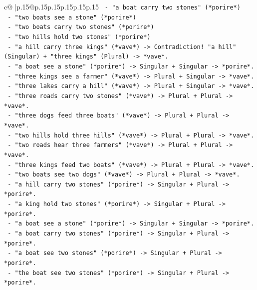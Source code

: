 \documentclass{article}
\begin{document}
{\begin{supertabular}{c@{$\;$}|p{.15\linewidth}@{}p{.15\linewidth}p{.15\linewidth}p{.15\linewidth}p{.15\linewidth}p{.15\linewidth}}
{{{\texttt{         {-} "a boat carry two stones" (*porire*)} \\
\texttt{         {-} "two boats see a stone" (*porire*)} \\
\texttt{         {-} "two boats carry two stones" (*porire*)} \\
\texttt{         {-} "two hills hold two stones" (*porire*)} \\
\texttt{         {-} "a hill carry three kings" (*vave*) {-}> Contradiction! "a hill" (Singular) + "three kings" (Plural) {-}> *vave*.} \\
\texttt{         {-} "a boat see a stone" (*porire*) {-}> Singular + Singular {-}> *porire*.} \\
\texttt{         {-} "three kings see a farmer" (*vave*) {-}> Plural + Singular {-}> *vave*.} \\
\texttt{         {-} "three lakes carry a hill" (*vave*) {-}> Plural + Singular {-}> *vave*.} \\
\texttt{         {-} "three roads carry two stones" (*vave*) {-}> Plural + Plural {-}> *vave*.} \\
\texttt{         {-} "three dogs feed three boats" (*vave*) {-}> Plural + Plural {-}> *vave*.} \\
\texttt{         {-} "two hills hold three hills" (*vave*) {-}> Plural + Plural {-}> *vave*.} \\
\texttt{         {-} "two roads hear three farmers" (*vave*) {-}> Plural + Plural {-}> *vave*.} \\
\texttt{         {-} "three kings feed two boats" (*vave*) {-}> Plural + Plural {-}> *vave*.} \\
\texttt{         {-} "two boats see two dogs" (*vave*) {-}> Plural + Plural {-}> *vave*.} \\
\texttt{         {-} "a hill carry two stones" (*porire*) {-}> Singular + Plural {-}> *porire*.} \\
\texttt{         {-} "a king hold two stones" (*porire*) {-}> Singular + Plural {-}> *porire*.} \\
\texttt{         {-} "a boat see a stone" (*porire*) {-}> Singular + Singular {-}> *porire*.} \\
\texttt{         {-} "a boat carry two stones" (*porire*) {-}> Singular + Plural {-}> *porire*.} \\
\texttt{         {-} "a boat see two stones" (*porire*) {-}> Singular + Plural {-}> *porire*.} \\
\texttt{         {-} "the boat see two stones" (*porire*) {-}> Singular + Plural {-}> *porire*.} \\
}}}
\end{supertabular}}
\end{document}
